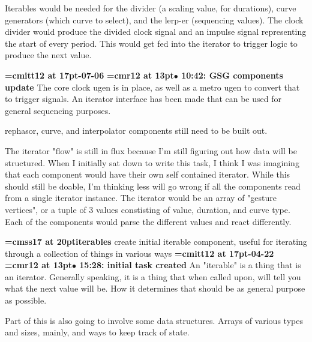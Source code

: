 Iterables would be needed for the divider (a scaling value, for durations), curve generators (which curve to select), and the lerp-er (sequencing values). The clock divider would produce the divided clock signal and an impulse signal representing the start of every period. This would get fed into the iterator to trigger logic to produce the next value.
\par

{\medskip\noindent\bf\font\titlefont=cmitt12 at 17pt-07-06}\medskip
{\smallskip\noindent\bf\font\titlefont=cmr12 at 13pt\titlefont $\bullet$ 10:42: GSG components update}\smallskip
The core clock ugen is in place, as well as a metro ugen to convert that to trigger signals. An iterator interface has been made that can be used for general sequencing purposes.
\par

rephasor, curve, and interpolator components still need to be built out.
\par

The iterator "flow" is still in flux because I'm still figuring out how data will be structured. When I initially sat down to write this task, I think I was imagining that each component would have their own self contained iterator. While this should still be doable, I'm thinking less will go wrong if all the components read from a single iterator instance. The iterator would be an array of "gesture vertices", or a tuple of 3 values constisting of value, duration, and curve type. Each of the components would parse the different values and react differently.
\par

{\medskip\noindent\bf\font\titlefont=cmss17 at 20pt\titlefont iterables}\medskip
create initial iterable component, useful for iterating through
a collection of things in various ways
{\medskip\noindent\bf\font\titlefont=cmitt12 at 17pt-04-22}\medskip
{\smallskip\noindent\bf\font\titlefont=cmr12 at 13pt\titlefont $\bullet$ 15:28: initial task created}\smallskip
An "iterable" is a thing that is an iterator. Generally speaking, it is a thing that when called upon, will tell you what the next value will be. How it determines that should be as general purpose as possible.
\par

Part of this is also going to involve some data structures. Arrays of various types and sizes, mainly, and ways to keep track of state.
\par

